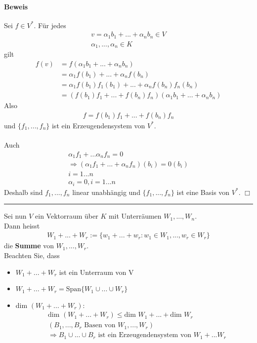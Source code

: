 \documentclass[11pt]{report}
\newcommand*\f[1] {\textbf{#1}}
\begin{document}
\paragraph{Beweis}
Sei $f \in V^{*}$. Für jedes
\begin{align}
 v = \alpha_1 b_1 + ... + \alpha_n b_n \in V \\
 \alpha_1, ..., \alpha_n \in K
\end{align}
gilt 
\begin{align}
 f(v) &= f(\alpha_1 b_1 + ... + \alpha_n b_n) \\
&= \alpha_1 f(b_1) + ... + \alpha_n f(b_n) \\
&= \alpha_1 f(b_1) f_1(b_1) + ... + \alpha_n f(b_n) f_n (b_n) \\
&= (f(b_1)f_1 + ... + f(b_n)f_n)(\alpha_1 b_1 + ... + \alpha_n b_n)
\end{align}
Also
\begin{align}
 f = f(b_1)f_1 + ... + f(b_n) f_n
\end{align}
und $\{f_1, ..., f_n\}$ ist ein Erzeugendensystem von $V^{*}$. \\\\
Auch
\begin{align}
 \alpha_1 f_1 + ... \alpha_n f_n= 0 \\
\Rightarrow (\alpha_1 f_1 + ... + \alpha_n f_n)(b_i) = 0(b_i) \\
i = 1...n \\
\alpha_i = 0, i = 1...n
\end{align}
Deshalb sind $f_1, ..., f_n$ linear unabhängig und $\{f_1, ..., f_n\}$ ist eine Basis von $V^{*}$. \hfill $\Box$
\vspace*{0.2cm}\rule{\linewidth}{0.3mm}\vspace{0.2cm}
Sei nun $V$ ein Vektorraum über $K$ mit Unterräumen $W_1, ..., W_n$.\\
Dann heisst
\begin{align}
 W_1 + ... + W_r := \{w_1 + ... + w_r: w_1 \in W_1, ..., w_r \in W_r\}
\end{align}
die \f{Summe} von $W_1, ..., W_r$. \\
Beachten Sie, dass 
\begin{itemize}
 \item $W_1 + ... + W_r$ ist ein Unterraum von V
 \item $W_1 + ... + W_r = \text{Span}\{W_1 \cup ... \cup W_r\}$
 \item dim $(W_1 + ... + W_r)$:
\begin{align} 
&\text{dim } (W_1 + ... + W_r) \leq \text{dim } W_1 + ... + \text{dim }W_r \\
&(B_1, ..., B_r \text{ Basen von } W_1, ..., W_r) \\ &\Rightarrow B_1 \cup ... \cup B_r \text{ ist ein Erzeugendensystem von } W_1 + ... W_r
\end{align}
\end{itemize}
\end{document}
